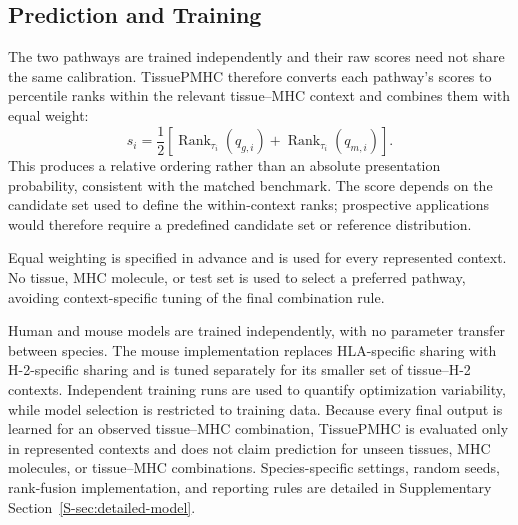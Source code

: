 \subsection{Prediction and Training}

The two pathways are trained independently and their raw scores need not share the same calibration. TissuePMHC therefore converts each pathway's scores to percentile ranks within the relevant tissue--MHC context and combines them with equal weight:
\[
s_i=\frac{1}{2}\left[
\operatorname{Rank}_{\tau_i}(q_{g,i})+
\operatorname{Rank}_{\tau_i}(q_{m,i})
\right].
\]
This produces a relative ordering rather than an absolute presentation probability, consistent with the matched benchmark. The score depends on the candidate set used to define the within-context ranks; prospective applications would therefore require a predefined candidate set or reference distribution.

Equal weighting is specified in advance and is used for every represented context. No tissue, MHC molecule, or test set is used to select a preferred pathway, avoiding context-specific tuning of the final combination rule.

Human and mouse models are trained independently, with no parameter transfer between species. The mouse implementation replaces HLA-specific sharing with H-2-specific sharing and is tuned separately for its smaller set of tissue--H-2 contexts. Independent training runs are used to quantify optimization variability, while model selection is restricted to training data. Because every final output is learned for an observed tissue--MHC combination, TissuePMHC is evaluated only in represented contexts and does not claim prediction for unseen tissues, MHC molecules, or tissue--MHC combinations. Species-specific settings, random seeds, rank-fusion implementation, and reporting rules are detailed in Supplementary Section~\ref{S-sec:detailed-model}.
